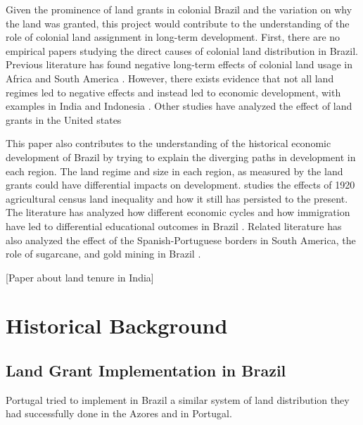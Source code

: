 \documentclass{article}
\begin{document}
Given the prominence of land grants in colonial Brazil and the variation on why the land was granted, this project would contribute to the understanding of the role of colonial land assignment in long-term development.  
First, there are no empirical papers studying the direct causes of colonial land distribution in Brazil. 
Previous literature has found negative long-term effects of colonial land usage in Africa and South America \parencites{Dell2010-qt}{Lowes2021-ww}. 
However, there exists evidence that not all land regimes led to negative effects and instead led to economic development, with examples in India and Indonesia \parencites{Banerjee2005-ki}{Dell2019-np}{Ratnoo2023-vw}.  
Other studies have analyzed the effect of land grants in the United states \parencites{Akee2014-uw}{Allen2019-kh}{Smith2023-ip}

This paper also contributes to the understanding of the historical economic development of Brazil by trying to explain the diverging paths in development in each region. 
The land regime and size in each region, as measured by the land grants could have differential impacts on development.
\textcite{Wigton-Jones2020-ex} studies the effects of 1920 agricultural census land inequality and how it still has persisted to the present.
The literature has analyzed how different economic cycles and how immigration have led to differential educational outcomes in Brazil \parencites{Musacchio2014-pq}{Rocha2017-yq}.
Related literature has also analyzed the effect of the Spanish-Portuguese borders in South America, the role of sugarcane, and gold mining in Brazil \parencites{Laudares2022-vy}{Naritomi2012-or}.

\parencite{Dell2010-qt}
\parencite{Sokoloff2000-mb}



\textcite{Ratnoo2023-vw} [Paper about land tenure in India]


\section{Historical Background}

\subsection{Land Grant Implementation in Brazil}

Portugal tried to implement in Brazil a similar system of land distribution they had successfully done in the Azores and in Portugal.
\end{document}
